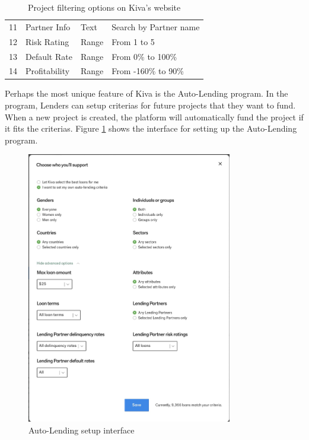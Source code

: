 \begin{table}[H]
{\begin{tabular}{|l|l|l|l|}
			11 & Partner Info                  & Text            & Search by Partner name                                                                                                  \\
			12 & Risk Rating                   & Range           & From 1 to 5                                                                                                             \\
			13 & Default Rate                  & Range           & From 0\% to 100\%                                                                                                       \\
			14 & Profitability                 & Range           & From -160\% to 90\%                                                                                                     \\
			\hline
		\end{tabular}%
	}
	\caption{Project filtering options on Kiva's website \cite{kiva-browse}}
	\label{tab:browser-criteria}
\end{table}

Perhaps the most unique feature of Kiva is the Auto-Lending program.
In the program, Lenders can setup criterias for future projects that they want to fund.
When a new project is created, the platform will automatically fund the project if it fits the criterias.
Figure \ref{fig:auto-lend-setup} shows the interface for setting up the Auto-Lending program.

\begin{figure}[H]
	\centering
	\includegraphics[width=0.8\textwidth]{images/auto-lend-setup.png}
	\caption{Auto-Lending setup interface \cite{kiva-autolend2}}
	\label{fig:auto-lend-setup}
\end{figure}

